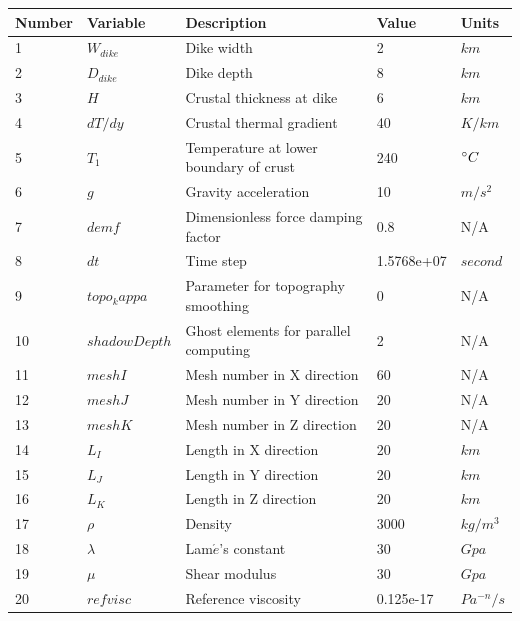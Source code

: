 \begin{table}[h]
 \centering
 \small
  \begin{tabular}[h]{l l p{6.8cm} l l}
\hline
\hline
Number & Variable & Description & Value & Units \\ 
\hline
1    &  $W_{dike}$    &   Dike width        & 2   &  $km$\\
\hline
2    &  $D_{dike}$    &   Dike depth        & 8   &  $km$\\
\hline
3    &  $H$    &   Crustal thickness at dike   & 6   &  $km$ \\
\hline
4    &  $dT/dy$    &   Crustal thermal gradient        & 40   &  $K/km$ \\
\hline
5    &  $T_{1}$    &   Temperature at lower boundary of crust    & 240   &  $\degree C$ \\
\hline
6    &  $g$    &   Gravity acceleration    & 10   &  $m/s^{2}$ \\
\hline
7    &  $demf$    &   Dimensionless force damping factor   & 0.8   &  N/A  \\
\hline
8    &  $dt$    &   Time step    & 1.5768e+07   &  $second$  \\
\hline
9    &  $topo_kappa$    &   Parameter for topography smoothing    & 0   &  N/A   \\
\hline
10   &  $shadowDepth$    &   Ghost elements for parallel computing   & 2   &  N/A   \\
\hline
11   &  $meshI$    &   Mesh number in X direction   & 60   &  N/A   \\
\hline
12   &  $meshJ$    &   Mesh number in Y direction      & 20   & N/A  \\
\hline
13   &  $meshK$    &   Mesh number in Z direction      & 20   & N/A  \\
\hline
14   &  $L_{I}$    &   Length in X direction      & 20   & $km$  \\
\hline
15   &  $L_{J}$    &   Length in Y direction      & 20   & $km$  \\
\hline
16   &  $L_{K}$    &   Length in Z direction      & 20   & $km$  \\
\hline
17   &  $\rho$    &    Density      & 3000   & $kg/m^{3}$  \\
\hline
18   &  $\lambda$    &    Lam$\acute{e}$'s constant      & 30   & $Gpa$  \\
\hline
19   &  $\mu$    &    Shear modulus      & 30   & $Gpa$  \\
\hline
20   &  $refvisc$    &    Reference viscosity      & 0.125e-17   & $Pa^{-n}/s$  \\

\end{tabular}
\end{table}

